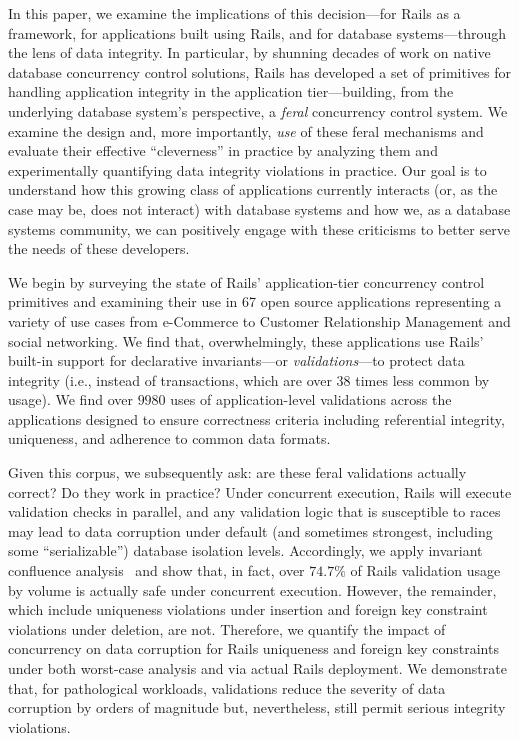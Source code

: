 In this paper, we examine the implications of this decision---for
Rails as a framework, for applications built using Rails, and for
database systems---through the lens of data integrity. In particular,
by shunning decades of work on native database concurrency control
solutions, Rails has developed a set of primitives for handling
application integrity in the application tier---building, from the
underlying database system's perspective, a \textit{feral} concurrency
control system. We examine the design and, more importantly,
\textit{use} of these feral mechanisms and evaluate their effective
``cleverness'' in practice by analyzing them and experimentally
quantifying data integrity violations in practice. Our goal is to
understand how this growing class of applications currently interacts
(or, as the case may be, does not interact) with database systems and
how we, as a database systems community, we can positively engage with
these criticisms to better serve the needs of these developers.

We begin by surveying the state of Rails' application-tier concurrency
control primitives and examining their use in 67 open source
applications representing a variety of use cases from e-Commerce to
Customer Relationship Management and social networking. We find that,
overwhelmingly, these applications use Rails' built-in support for
declarative invariants---or \textit{validations}---to protect data
integrity (i.e., instead of transactions, which are over 38 times less
common by usage). We find over $9980$ uses of application-level
validations across the applications designed to ensure correctness
criteria including referential integrity, uniqueness, and adherence to
common data formats.

Given this corpus, we subsequently ask: are these feral validations
actually correct? Do they work in practice? Under concurrent
execution, Rails will execute validation checks in parallel, and any
validation logic that is susceptible to races may lead to data
corruption under default (and sometimes strongest, including some
``serializable'') database isolation levels. Accordingly, we apply
invariant confluence analysis~\cite{coord-avoid} and show that, in
fact, over $74.7\%$ of Rails validation usage by volume is actually
safe under concurrent execution. However, the remainder, which include
uniqueness violations under insertion and foreign key constraint
violations under deletion, are not. Therefore, we quantify the impact
of concurrency on data corruption for Rails uniqueness and foreign key
constraints under both worst-case analysis and via actual Rails
deployment. We demonstrate that, for pathological workloads,
validations reduce the severity of data corruption by orders of
magnitude but, nevertheless, still permit serious integrity violations.

